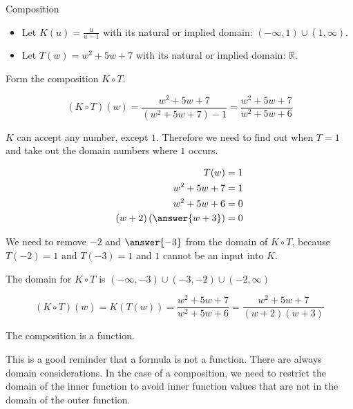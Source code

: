 \documentclass{ximera}
\begin{document}
\begin{example} Composition


\begin{itemize}
\item Let $K(u) = \frac{u}{u-1}$ with its natural or implied domain: $(-\infty, 1) \cup (1, \infty)$. \\

\item Let $T(w) = w^2 + 5w + 7$ with its natural or implied domain: \textbf{$\mathbb{R}$}.
\end{itemize}


Form the composition $K \circ T$.

\[        (K \circ T)(w) =     \frac{w^2 + 5w + 7}{(w^2 + 5w + 7)-1}   =    \frac{w^2 + 5w + 7}{w^2 + 5w + 6}  \]


$K$ can accept any number, except $1$.  Therefore we need to find out when $T = 1$ and take out the domain numbers where $1$ occurs.



\begin{align*}
T(w) & = 1   \\
w^2 + 5w + 7 & = 1 \\
w^2 + 5w + 6 & = 0   \\
(w+2)\left( \answer{w+3} \right) & = 0
\end{align*}


We need to remove $-2$ and $\answer{-3}$ from the domain of $K \circ T$, because $T(-2)=1$ and $T(-3)=1$ and $1$ cannot be an input into $K$.


The domain for $K \circ T$ is $(-\infty, -3) \cup (-3, -2) \cup (-2, \infty)$




\[        (K \circ T)(w)  =  K(T(w))  = \frac{w^2 + 5w + 7}{w^2 + 5w + 6}  =    \frac{w^2 + 5w + 7}{(w+2)(w+3)} \]










The composition is a function. 


This is a good reminder that a formula is not a function. There are always domain considerations.  In the case of a composition, we need to restrict the domain of the inner function to avoid inner function values that are not in the domain of the outer function.










\end{example}
\end{document}
